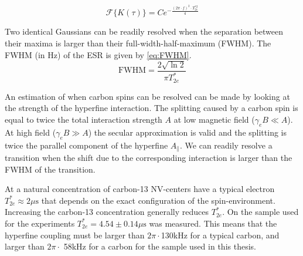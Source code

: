 \begin{equation}
    \mathcal{F} \{ K(\tau) \} =  C e^{-\tfrac{(2\pi \cdot f) ^2 \cdot T_{2e}^{*2}}{ 4}}
    \label{eq:ESR_dip_shape}
\end{equation}

Two identical Gaussians can be readily resolved when the separation between their maxima is larger than their full-width-half-maximum (FWHM).
The FWHM (in Hz) of the ESR is given by \cref{eq:FWHM}.
\begin{equation}
    \mathrm{FWHM} =  \frac{2\sqrt{\ln{2}}}{\pi T_{2e}^*}
    \label{eq:FWHM}
\end{equation}

An estimation of when carbon spins can be resolved can be made by looking at the strength of the hyperfine interaction.
The splitting caused by a carbon spin is equal to twice the total interaction strength $A$ at low magnetic field ($\gamma_e B \ll A$).
At high field ($\gamma_e B \gg A$) the secular approximation is valid and the splitting is twice the parallel component of the hyperfine $A_\parallel$.
We can readily resolve a transition when the shift due to the corresponding interaction is larger than the FWHM of the transition.

At a natural concentration of carbon-13 NV-centers have a typical  electron $T_{2e}^* \approx 2\mu \mathrm{s}$ that depends on the exact configuration of the spin-environment.
Increasing the carbon-13 concentration generally reduces $T_{2e}^*$.
On the sample used for the experiments $T_{2e}^*=4.54 \pm 0.14 \mu\mathrm{s}$ was measured.
This means that the hyperfine coupling must be larger than $2\pi\cdot$130kHz for a typical carbon, and larger than $2\pi\cdot$ 58kHz for a carbon for the sample used in this thesis.
